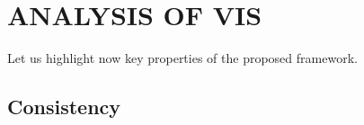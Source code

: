 \section{ANALYSIS OF VIS}

Let us highlight now key properties of the proposed framework.

\subsection{Consistency}

